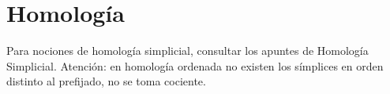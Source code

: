 \documentclass[TA.tex]{subfiles}
\begin{document}

\chapter{Homología}

Para nociones de homología simplicial, consultar los apuntes de Homología Simplicial. Atención: en homología ordenada no existen los símplices en orden distinto al prefijado, no se toma cociente. 
\section{}
\end{document}
